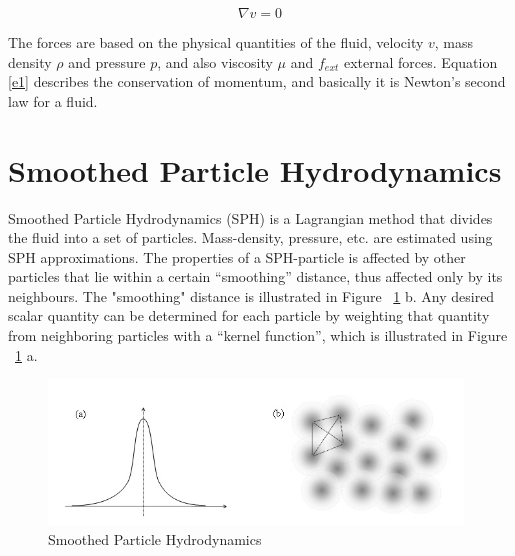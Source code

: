 \documentclass[a4paper,12pt,twoside,final]{report}
\begin{document}
\begin{equation}
{\nabla v} = {0}
\label{e0}
\end{equation}

\noindent The forces are based on the physical quantities of the fluid, velocity $v$, mass density $\rho$ and pressure $p$, and also viscosity $\mu$ and $f_{ext}$ external forces. Equation \ref{e1} describes the conservation of momentum, and basically it is Newton’s second law for a fluid.\\


\section{Smoothed Particle Hydrodynamics}
Smoothed Particle Hydrodynamics (SPH) is a Lagrangian method that divides the fluid into a set of particles. Mass-density, pressure, etc. are estimated using SPH approximations. The properties of a SPH-particle is affected by other particles that lie within a certain “smoothing” distance, thus affected only by its neighbours. The "smoothing" distance is illustrated in Figure ~\ref{fig:sph} b. Any desired scalar quantity can be determined for each particle by weighting that quantity from neighboring particles with a “kernel function”, which is illustrated in Figure ~\ref{fig:sph} a. \\

\begin{figure}[h]
\begin{center}
    \includegraphics[width=11cm]{figs/sph.jpg} 
\end{center}
\caption{Smoothed Particle Hydrodynamics}
\label{fig:sph}
\end{figure}
\end{document}
